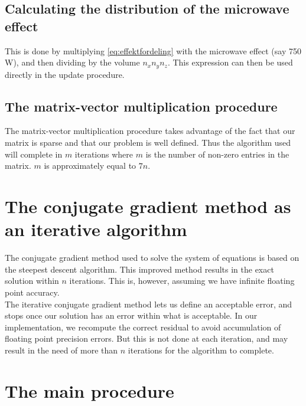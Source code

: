 \subsection{Calculating the distribution of the microwave effect}

This is done by multiplying \cref{eq:effektfordeling} with the microwave effect
(say 750 W), and then dividing by the volume $n_x n_y n_z$. This expression can
then be used directly in the update procedure.

\subsection{The matrix-vector multiplication procedure}

The matrix-vector multiplication procedure takes advantage of the fact that our 
matrix is sparse and that our problem is well defined. Thus the algorithm used
will complete in $m$ iterations where $m$ is the number of non-zero entries in 
the matrix. $m$ is approximately equal to $7n$.

\section{The conjugate gradient method as an iterative algorithm}

The conjugate gradient method used to solve the system of equations is based on
the steepest descent algorithm. This improved method results in the exact solution within
$n$ iterations. This is, however, assuming we have infinite floating point
accuracy. \\

The iterative conjugate gradient method lets us define an acceptable error, and stops
once our solution has an error within what is acceptable.
In our implementation, we recompute the correct residual to avoid accumulation of
floating point precision errors. But this is not done at each iteration, and may
result in the need of more than $n$ iterations for the algorithm to complete.

\section{The main procedure}

